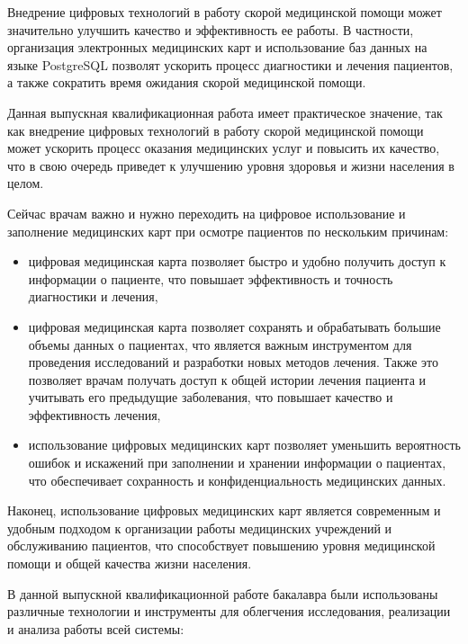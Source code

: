 Внедрение цифровых технологий в работу скорой медицинской помощи может значительно улучшить качество и эффективность ее работы. В частности, организация электронных медицинских карт и использование баз данных на языке PostgreSQL позволят ускорить процесс диагностики и лечения пациентов, а также сократить время ожидания скорой медицинской помощи.

Данная выпускная квалификационная работа имеет практическое значение, так как внедрение цифровых технологий в работу скорой медицинской помощи может ускорить процесс оказания медицинских услуг и повысить их качество, что в свою очередь приведет к улучшению уровня здоровья и жизни населения в целом.

Сейчас врачам важно и нужно переходить на цифровое использование и заполнение медицинских карт при осмотре пациентов по нескольким причинам:

\begin{itemize}
    \item цифровая медицинская карта позволяет быстро и удобно получить доступ к информации о пациенте, что повышает эффективность и точность диагностики и лечения,
    \item цифровая медицинская карта позволяет сохранять и обрабатывать большие объемы данных о пациентах, что является важным инструментом для проведения исследований и разработки новых методов лечения. Также это позволяет врачам получать доступ к общей истории лечения пациента и учитывать его предыдущие заболевания, что повышает качество и эффективность лечения,
    \item использование цифровых медицинских карт позволяет уменьшить вероятность ошибок и искажений при заполнении и хранении информации о пациентах, что обеспечивает сохранность и конфиденциальность медицинских данных.
\end{itemize}

Наконец, использование цифровых медицинских карт является современным и удобным подходом к организации работы медицинских учреждений и обслуживанию пациентов, что способствует повышению уровня медицинской помощи и общей качества жизни населения.

В данной выпускной квалификационной работе бакалавра были использованы различные технологии и инструменты для облегчения исследования, реализации и анализа работы всей системы:

